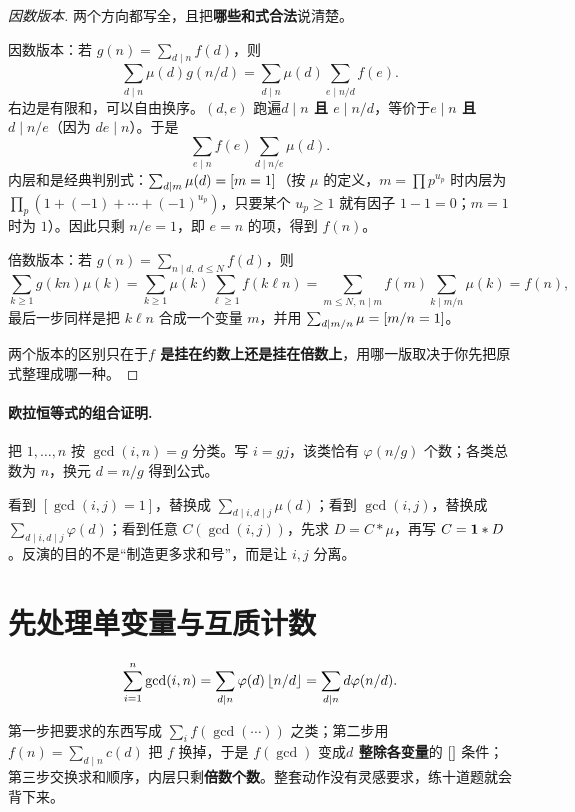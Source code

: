 \begin{proof}[因数版本]
两个方向都写全，且把\textbf{哪些和式合法}说清楚。

因数版本：若 $g(n)=\sum_{d\mid n}f(d)$，则
\[
 \sum_{d\mid n}\mu(d)g(n/d)
 =\sum_{d\mid n}\mu(d)\sum_{e\mid n/d}f(e).
\]
右边是有限和，可以自由换序。$(d,e)$ 跑遍\textbf{$d\mid n$ 且 $e\mid n/d$}，等价于\textbf{$e\mid n$ 且 $d\mid n/e$}（因为 $de\mid n$）。于是
\[
 \sum_{e\mid n}f(e)\sum_{d\mid n/e}\mu(d).
\]
内层和是经典判别式：$\sum_{d\mid m}\mu(d)=\left[m=1\right]$（按 $\mu$ 的定义，$m=\prod p^{u_p}$ 时内层为 $\prod_p(1+(-1)+\cdots+(-1)^{u_p})$，只要某个 $u_p\ge1$ 就有因子 $1-1=0$；$m=1$ 时为 $1$）。因此只剩 $n/e=1$，即 $e=n$ 的项，得到 $f(n)$。

倍数版本：若 $g(n)=\sum_{n\mid d,\ d\le N}f(d)$，则
\[
 \sum_{k\ge1}g(kn)\mu(k)=\sum_{k\ge1}\mu(k)\sum_{\ell\ge1}f(k\ell n)
 =\sum_{m\le N,\,n\mid m}f(m)\!\!\sum_{k\mid m/n}\!\!\mu(k)=f(n),
\]
最后一步同样是把 $k\ell n$ 合成一个变量 $m$，并用 $\sum_{d\mid m/n}\mu=\left[m/n=1\right]$。

两个版本的区别只在于\textbf{$f$ 是挂在约数上还是挂在倍数上}，用哪一版取决于你先把原式整理成哪一种。
\end{proof}
\paragraph{欧拉恒等式的组合证明.}
把 $1,\ldots,n$ 按 $\gcd(i,n)=g$ 分类。写 $i=gj$，该类恰有 $\varphi(n/g)$ 个数；各类总数为 $n$，换元 $d=n/g$ 得到公式。
\begin{teach}[怎样想到反演？]
看到 $[\gcd(i,j)=1]$，替换成 $\sum_{d\mid i,d\mid j}\mu(d)$；看到 $\gcd(i,j)$，替换成 $\sum_{d\mid i,d\mid j}\varphi(d)$；看到任意 $C(\gcd(i,j))$，先求 $D=C*\mu$，再写 $C=\mathbf 1*D$。反演的目的不是“制造更多求和号”，而是让 $i,j$ 分离。
\end{teach}


\section{先处理单变量与互质计数}
\[
 \sum_{i=1}^n\gcd(i,n)
 =\sum_{d\mid n}\varphi(d)\left\lfloor n/d\right\rfloor
 =\sum_{d\mid n}d\varphi(n/d).
\]

\begin{tip}
第一步把要求的东西写成 $\sum_{i}f(\gcd(\cdots))$ 之类；第二步用 $f(n)=\sum_{d\mid n}c(d)$ 把 $f$ 换掉，于是 $f(\gcd)$ 变成\textbf{$d$ 整除各变量}的 $\left[\right]$ 条件；第三步交换求和顺序，内层只剩\textbf{倍数个数}。整套动作没有灵感要求，练十道题就会背下来。
\end{tip}

